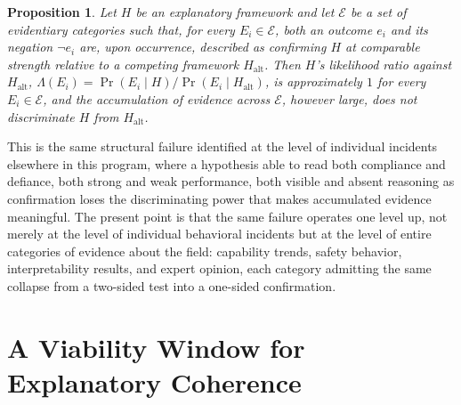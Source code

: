 \documentclass[11pt]{article}
\newtheorem{proposition}{Proposition}
\begin{document}
\begin{proposition}
Let $H$ be an explanatory framework and let $\mathcal{E}$ be a set of evidentiary categories such that, for every $E_i \in \mathcal{E}$, both an outcome $e_i$ and its negation $\neg e_i$ are, upon occurrence, described as confirming $H$ at comparable strength relative to a competing framework $H_{\text{alt}}$. Then $H$'s likelihood ratio against $H_{\text{alt}}$, $\Lambda(E_i) = \Pr(E_i \mid H) / \Pr(E_i \mid H_{\text{alt}})$, is approximately $1$ for every $E_i \in \mathcal{E}$, and the accumulation of evidence across $\mathcal{E}$, however large, does not discriminate $H$ from $H_{\text{alt}}$.
\end{proposition}

This is the same structural failure identified at the level of individual incidents elsewhere in this program, where a hypothesis able to read both compliance and defiance, both strong and weak performance, both visible and absent reasoning as confirmation loses the discriminating power that makes accumulated evidence meaningful. The present point is that the same failure operates one level up, not merely at the level of individual behavioral incidents but at the level of entire categories of evidence about the field: capability trends, safety behavior, interpretability results, and expert opinion, each category admitting the same collapse from a two-sided test into a one-sided confirmation.

\section{A Viability Window for Explanatory Coherence}
\end{document}
